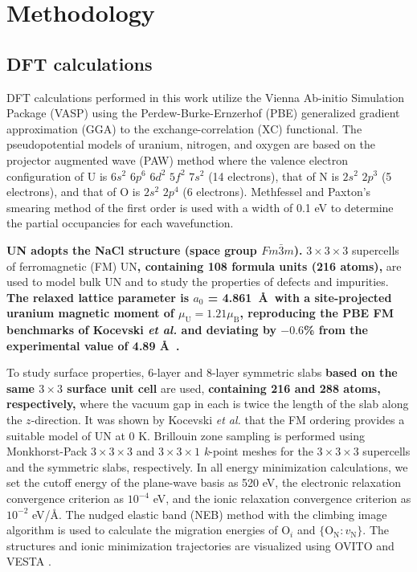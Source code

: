 \documentclass[preprint,12pt,sort&compress]{elsarticle}
\newcommand{\?}{\stackrel{?}{=}}
\providecommand{\DIFaddtex}[1]{{\bf #1}} %
\providecommand{\DIFdeltex}[1]{} %
\providecommand{\DIFaddbegin}{\protect\color{blue}} %
\providecommand{\DIFaddend}{\protect\color{black}} %
\providecommand{\DIFdelbegin}{\protect\color{red}} %
\providecommand{\DIFdelend}{\protect\color{black}} %
\providecommand{\DIFadd}[1]{\texorpdfstring{\DIFaddtex{#1}}{#1}} %
\providecommand{\DIFdel}[1]{\texorpdfstring{\DIFdeltex{#1}}{}} %
\newcommand{\DIFscaledelfig}{0.5}
\newlength{\DIFdelgraphicswidth} %
\newlength{\DIFdelgraphicsheight} %
\newcommand{\DIFaddincludegraphics}[2][]{{\color{blue}\fbox{\DIFOincludegraphics[#1]{#2}}}} %
\newcommand{\DIFdelincludegraphics}[2][]{%
\sbox{\DIFdelgraphicsbox}{\DIFOincludegraphics[#1]{#2}}%
\settoboxwidth{\DIFdelgraphicswidth}{\DIFdelgraphicsbox} %
\settoboxtotalheight{\DIFdelgraphicsheight}{\DIFdelgraphicsbox} %
\scalebox{\DIFscaledelfig}{%
\parbox[b]{\DIFdelgraphicswidth}{\usebox{\DIFdelgraphicsbox}\\[-\baselineskip] \rule{\DIFdelgraphicswidth}{0em}}\llap{\resizebox{\DIFdelgraphicswidth}{\DIFdelgraphicsheight}{%
\setlength{\unitlength}{\DIFdelgraphicswidth}%
\begin{picture}(1,1)%
\thicklines\linethickness{2pt} %
{\color[rgb]{1,0,0}\put(0,0){\framebox(1,1){}}}%
{\color[rgb]{1,0,0}\put(0,0){\line( 1,1){1}}}%
{\color[rgb]{1,0,0}\put(0,1){\line(1,-1){1}}}%
\end{picture}%
}\hspace*{3pt}}} %
} %
\DeclareRobustCommand{\DIFaddbegin}{\DIFOaddbegin \let\includegraphics\DIFaddincludegraphics} %
\DeclareRobustCommand{\DIFaddend}{\DIFOaddend \let\includegraphics\DIFOincludegraphics} %
\DeclareRobustCommand{\DIFdelbegin}{\DIFOdelbegin \let\includegraphics\DIFdelincludegraphics} %
\DeclareRobustCommand{\DIFdelend}{\DIFOaddend \let\includegraphics\DIFOincludegraphics} %
\begin{document}
\section{Methodology}

\subsection{DFT calculations}

DFT calculations performed in this work utilize the Vienna Ab-initio Simulation Package (VASP) \cite{Kresse1993, Kresse1996a, Kresse1996b} using the Perdew-Burke-Ernzerhof (PBE) \cite{Perdew1996} generalized gradient approximation (GGA) to the exchange-correlation (XC) functional. The pseudopotential models of uranium, nitrogen, and oxygen are based on the projector augmented wave (PAW) method \cite{Kresse1999} where the valence electron configuration of U is $6s^2$ $6p^6$ $6d^2$ $5f^2$ $7s^2$ (14 electrons), that of N is $2s^2$ $2p^3$ (5 electrons), and that of O is $2s^2$ $2p^4$ (6 electrons). Methfessel and Paxton’s smearing method \cite{Methfessel1989} of the first order is used with a width of 0.1 eV to determine the partial occupancies for each wavefunction.
\DIFaddbegin 

\DIFadd{UN adopts the NaCl structure (space group $Fm\bar{3}m$). }\DIFaddend $3 \times 3 \times 3$ supercells of ferromagnetic (FM) UN\DIFaddbegin \DIFadd{, containing 108 formula units (216 atoms), }\DIFaddend are used to model bulk UN and to study the properties of defects and impurities. \DIFaddbegin \DIFadd{The relaxed lattice parameter is $a_0$ = 4.861~\AA\ with a site-projected uranium magnetic moment of $\mu_\text{U} = 1.21 \mu_\text{B}$, reproducing the PBE FM benchmarks of Kocevski \textit{et al.} \cite{Kocevski2022I} and deviating by $-0.6$\% from the experimental value of 4.89 \AA\ \cite{Hayes1990I}.
}

\DIFaddend To study surface properties, 6-layer and 8-layer symmetric slabs \DIFdelbegin \DIFdel{of FM UN }\DIFdelend \DIFaddbegin \DIFadd{based on the same $3 \times 3$ surface unit cell }\DIFaddend are used, \DIFaddbegin \DIFadd{containing 216 and 288 atoms, respectively, }\DIFaddend where the vacuum gap in each is twice the length of the slab along the $z$-direction. It was shown by Kocevski \textit{et al.}
\cite{Kocevski2022I} that the FM ordering provides a suitable model of UN at 0 K. Brillouin zone sampling is performed using Monkhorst-Pack \cite{Monkhorst1976} $3 \times 3 \times 3$ and $3 \times 3 \times 1$ \textit{k}-point meshes for the $3 \times 3 \times 3$ supercells and the symmetric slabs, respectively. In all energy minimization calculations, we set the cutoff energy of the plane-wave basis as 520 eV, the electronic relaxation convergence criterion as $10^{-4}$ eV, and the ionic relaxation convergence criterion as $10^{-2}$ eV/\AA. The nudged elastic band (NEB) method \cite{Henkelman2000a} with the climbing image algorithm \cite{Henkelman2000b} is used to calculate the migration energies of O$_i$ and $\{\text{O}_\text{N} \! : \! v_\text{N}\}$. The structures and ionic minimization trajectories are visualized using OVITO \cite{Stukowski2010} and VESTA \cite{Momma2008}.
\end{document}
